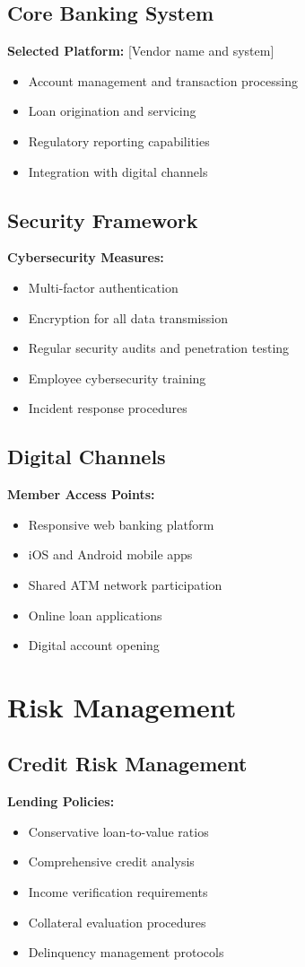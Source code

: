 \documentclass[11pt,letterpaper]{article}
\begin{document}
\subsection{Core Banking System}
\textbf{Selected Platform:} [Vendor name and system]
\begin{itemize}[leftmargin=*]
    \item Account management and transaction processing
    \item Loan origination and servicing
    \item Regulatory reporting capabilities
    \item Integration with digital channels
\end{itemize}

\subsection{Security Framework}
\textbf{Cybersecurity Measures:}
\begin{itemize}[leftmargin=*]
    \item Multi-factor authentication
    \item Encryption for all data transmission
    \item Regular security audits and penetration testing
    \item Employee cybersecurity training
    \item Incident response procedures
\end{itemize}

\subsection{Digital Channels}
\textbf{Member Access Points:}
\begin{itemize}[leftmargin=*]
    \item Responsive web banking platform
    \item iOS and Android mobile apps
    \item Shared ATM network participation
    \item Online loan applications
    \item Digital account opening
\end{itemize}

\section{Risk Management}

\subsection{Credit Risk Management}
\textbf{Lending Policies:}
\begin{itemize}[leftmargin=*]
    \item Conservative loan-to-value ratios
    \item Comprehensive credit analysis
    \item Income verification requirements
    \item Collateral evaluation procedures
    \item Delinquency management protocols
\end{itemize}
\end{document}
